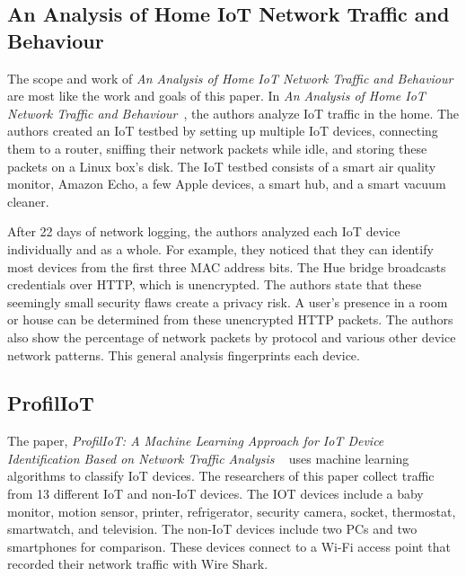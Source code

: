 \subsection{An Analysis of Home IoT Network Traffic and Behaviour}
\label{homeIoTPaper}
The scope and work of \textit{An Analysis of Home IoT Network Traffic and Behaviour}~\cite{home_iot} are most like the work and goals of this paper. In \textit{An Analysis of Home IoT Network Traffic and Behaviour}~\cite{home_iot}, the authors analyze IoT traffic in the home. The authors created an IoT testbed by setting up multiple IoT devices, connecting them to a router, sniffing their network packets while idle, and storing these packets on a Linux box's disk. The IoT testbed consists of a smart air quality monitor, Amazon Echo, a few Apple devices, a smart hub, and a smart vacuum cleaner.

After 22 days of network logging, the authors analyzed each IoT device individually and as a whole. For example, they noticed that they can identify most devices from the first three MAC address bits. The Hue bridge broadcasts credentials over HTTP, which is unencrypted. The authors state that these seemingly small security flaws create a privacy risk. A user’s presence in a room or house can be determined from these unencrypted HTTP packets. The authors also show the percentage of network packets by protocol and various other device network patterns. This general analysis fingerprints each device.

\subsection{ProfilIoT}
\label{ProfilIoTPaper}
The paper, \textit{ProfilIoT: A Machine Learning Approach for IoT Device Identification Based on Network Traffic Analysis} ~\cite{Meidan:2017:PML:3019612.3019878} uses machine learning algorithms to classify IoT devices. The researchers of this paper collect traffic from 13 different IoT and non-IoT devices. The IOT devices include a baby monitor, motion sensor, printer, refrigerator, security camera, socket, thermostat, smartwatch, and television. The non-IoT devices include two PCs and two smartphones for comparison. These devices connect to a Wi-Fi access point that recorded their network traffic with Wire Shark\cite{wireshark}.

